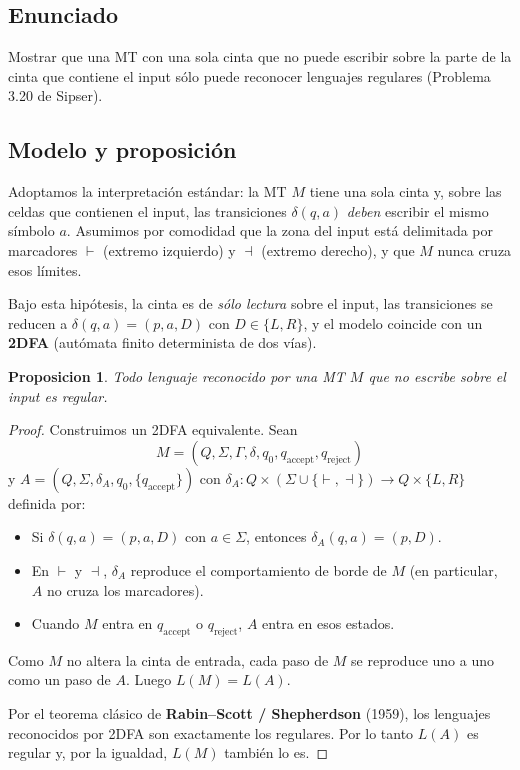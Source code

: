 \documentclass[11pt,a4paper]{article}
\theoremstyle{plain}
\newtheorem{proposicion}[teorema]{Proposicion}
\theoremstyle{definition}
\theoremstyle{remark}
\newcommand{\qaccept}{q_{\text{accept}}}
\newcommand{\qreject}{q_{\text{reject}}}
\begin{document}
\subsection*{Enunciado}

Mostrar que una MT con una sola cinta que no puede escribir sobre la parte
de la cinta que contiene el input s\'olo puede reconocer lenguajes regulares
(Problema 3.20 de Sipser).

\subsection*{Modelo y proposici\'on}

Adoptamos la interpretaci\'on est\'andar: la MT $M$ tiene una sola cinta y,
sobre las celdas que contienen el input, las transiciones $\delta(q,a)$
\emph{deben} escribir el mismo s\'imbolo $a$. Asumimos por comodidad que la
zona del input est\'a delimitada por marcadores $\vdash$ (extremo izquierdo)
y $\dashv$ (extremo derecho), y que $M$ nunca cruza esos l\'imites.

Bajo esta hip\'otesis, la cinta es de \emph{s\'olo lectura} sobre el input,
las transiciones se reducen a $\delta(q,a)=(p,a,D)$ con $D\in\{L,R\}$, y el
modelo coincide con un \textbf{2DFA} (aut\'omata finito determinista de dos
v\'ias).

\begin{proposicion}
\label{prop:read-only}
Todo lenguaje reconocido por una MT $M$ que no escribe sobre el input es
\emph{regular}.
\end{proposicion}

\begin{proof}
Construimos un 2DFA equivalente. Sean
\[
  M = (Q, \Sigma, \Gamma, \delta, q_0, \qaccept, \qreject)
\]
y $A=(Q, \Sigma, \delta_A, q_0, \{\qaccept\})$ con $\delta_A:Q\times(\Sigma\cup\{\vdash,\dashv\})\to Q\times\{L,R\}$ definida por:

\begin{itemize}
  \item Si $\delta(q,a)=(p,a,D)$ con $a\in\Sigma$, entonces $\delta_A(q,a)=(p,D)$.
  \item En $\vdash$ y $\dashv$, $\delta_A$ reproduce el comportamiento de
        borde de $M$ (en particular, $A$ no cruza los marcadores).
  \item Cuando $M$ entra en $\qaccept$ o $\qreject$, $A$ entra en esos
        estados.
\end{itemize}

Como $M$ no altera la cinta de entrada, cada paso de $M$ se reproduce uno a
uno como un paso de $A$. Luego $L(M) = L(A)$.

Por el teorema cl\'asico de \textbf{Rabin--Scott / Shepherdson} (1959), los
lenguajes reconocidos por 2DFA son exactamente los regulares. Por lo tanto
$L(A)$ es regular y, por la igualdad, $L(M)$ tambi\'en lo es.
\end{proof}
\end{document}

